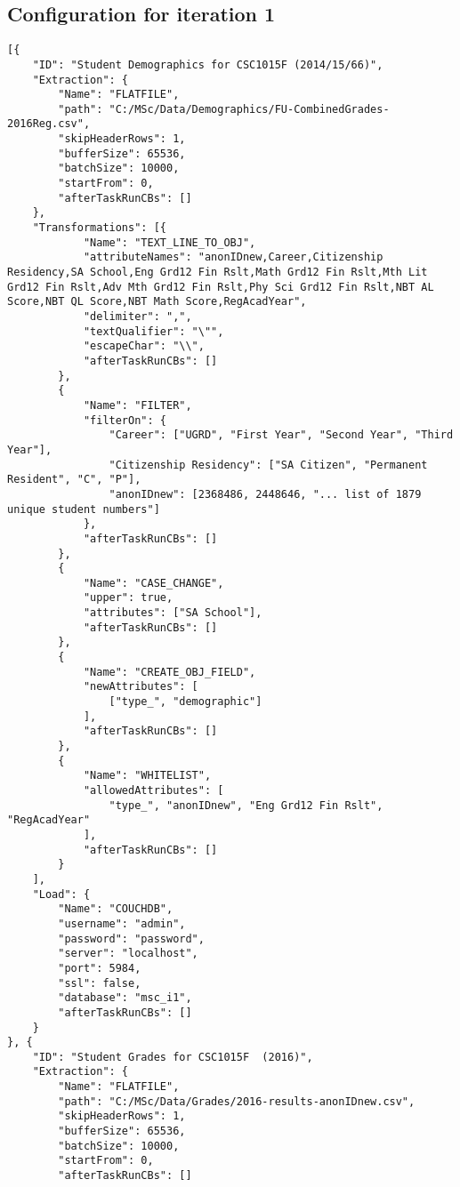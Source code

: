 \subsection{Configuration for iteration 1}
\label{appendix:config-i1}
\begin{verbatim}
[{
    "ID": "Student Demographics for CSC1015F (2014/15/66)",
    "Extraction": {
        "Name": "FLATFILE",
        "path": "C:/MSc/Data/Demographics/FU-CombinedGrades-2016Reg.csv",
        "skipHeaderRows": 1,
        "bufferSize": 65536,
        "batchSize": 10000,
        "startFrom": 0,
        "afterTaskRunCBs": []
    },
    "Transformations": [{
            "Name": "TEXT_LINE_TO_OBJ",
            "attributeNames": "anonIDnew,Career,Citizenship Residency,SA School,Eng Grd12 Fin Rslt,Math Grd12 Fin Rslt,Mth Lit Grd12 Fin Rslt,Adv Mth Grd12 Fin Rslt,Phy Sci Grd12 Fin Rslt,NBT AL Score,NBT QL Score,NBT Math Score,RegAcadYear",
            "delimiter": ",",
            "textQualifier": "\"",
            "escapeChar": "\\",
            "afterTaskRunCBs": []
        },
        {
            "Name": "FILTER",
            "filterOn": {
                "Career": ["UGRD", "First Year", "Second Year", "Third Year"],
                "Citizenship Residency": ["SA Citizen", "Permanent Resident", "C", "P"],
                "anonIDnew": [2368486, 2448646, "... list of 1879 unique student numbers"]
            },
            "afterTaskRunCBs": []
        },
        {
            "Name": "CASE_CHANGE",
            "upper": true,
            "attributes": ["SA School"],
            "afterTaskRunCBs": []
        },
        {
            "Name": "CREATE_OBJ_FIELD",
            "newAttributes": [
                ["type_", "demographic"]
            ],
            "afterTaskRunCBs": []
        },
        {
            "Name": "WHITELIST",
            "allowedAttributes": [
                "type_", "anonIDnew", "Eng Grd12 Fin Rslt", "RegAcadYear"
            ],
            "afterTaskRunCBs": []
        }
    ],
    "Load": {
        "Name": "COUCHDB",
        "username": "admin",
        "password": "password",
        "server": "localhost",
        "port": 5984,
        "ssl": false,
        "database": "msc_i1",
        "afterTaskRunCBs": []
    }
}, {
    "ID": "Student Grades for CSC1015F  (2016)",
    "Extraction": {
        "Name": "FLATFILE",
        "path": "C:/MSc/Data/Grades/2016-results-anonIDnew.csv",
        "skipHeaderRows": 1,
        "bufferSize": 65536,
        "batchSize": 10000,
        "startFrom": 0,
        "afterTaskRunCBs": []

\end{verbatim}
